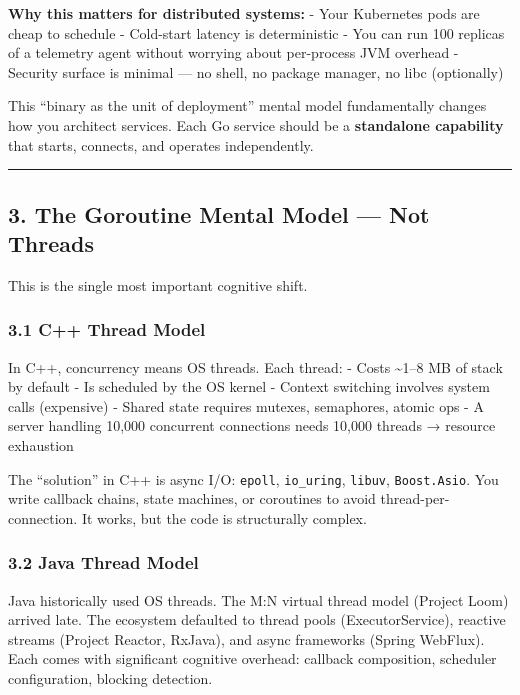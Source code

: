 \documentclass[11pt,openany]{book}
\begin{document}
\textbf{Why this matters for distributed systems:} - Your Kubernetes
pods are cheap to schedule - Cold-start latency is deterministic - You
can run 100 replicas of a telemetry agent without worrying about
per-process JVM overhead - Security surface is minimal --- no shell, no
package manager, no libc (optionally)

This ``binary as the unit of deployment'' mental model fundamentally
changes how you architect services. Each Go service should be a
\textbf{standalone capability} that starts, connects, and operates
independently.

\begin{center}\rule{0.5\linewidth}{0.5pt}\end{center}

\hypertarget{the-goroutine-mental-model-not-threads}{%
\subsection{3. The Goroutine Mental Model --- Not
Threads}\label{the-goroutine-mental-model-not-threads}}

This is the single most important cognitive shift.

\hypertarget{c-thread-model}{%
\subsubsection{3.1 C++ Thread Model}\label{c-thread-model}}

In C++, concurrency means OS threads. Each thread: - Costs
\textasciitilde1--8 MB of stack by default - Is scheduled by the OS
kernel - Context switching involves system calls (expensive) - Shared
state requires mutexes, semaphores, atomic ops - A server handling
10,000 concurrent connections needs 10,000 threads → resource exhaustion

The ``solution'' in C++ is async I/O: \texttt{epoll},
\texttt{io\_uring}, \texttt{libuv}, \texttt{Boost.Asio}. You write
callback chains, state machines, or coroutines to avoid
thread-per-connection. It works, but the code is structurally complex.

\hypertarget{java-thread-model}{%
\subsubsection{3.2 Java Thread Model}\label{java-thread-model}}

Java historically used OS threads. The M:N virtual thread model (Project
Loom) arrived late. The ecosystem defaulted to thread pools
(ExecutorService), reactive streams (Project Reactor, RxJava), and async
frameworks (Spring WebFlux). Each comes with significant cognitive
overhead: callback composition, scheduler configuration, blocking
detection.
\end{document}
